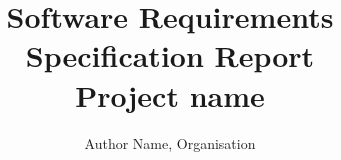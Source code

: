 \documentclass[a4paper, 12pt]{article}
\begin{document}
\begin{titlepage}
    \title{Software Requirements Specification Report \\ \textbf{\huge Project name}}
    \author{Author Name, Organisation}
    \maketitle
\end{titlepage}

    \tableofcontents
    \newpage

    
    
    
    
    
\end{document}
